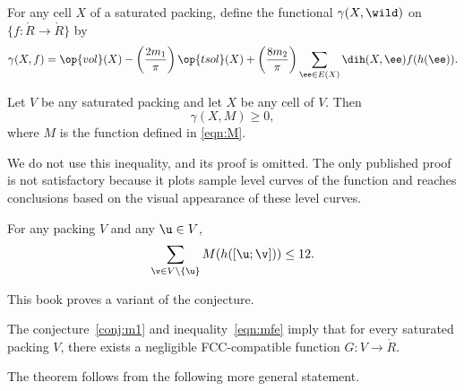 \begin{definition}[$\gamma$] 
   For any cell $X$ of a saturated
  packing, define the functional $\gamma(X,\wild)$ on
  $\{f:\ring{R}\to\ring{R}\}$ by
\begin{equation}\label{eqn:gamma-def} 
\gamma(X,f) =  \op{vol}(X)
-\left(\frac{2m_1}{\pi}\right) \op{tsol}(X) + \left(\frac{8m_2}{\pi}\right)
\sum_{\ee\in E(X)} \dih(X,\ee)  f(h(\ee)).
\end{equation}
%
\end{definition}


\begin{theorem*}[]\label{lemma:MI} 
  Let $V$ be any saturated packing and let $X$ be any cell of
  $V$.  Then
\begin{equation}\label{eqn:mfe} 
\gamma(X,M)\ge 0,
\end{equation}
where $M$ is the function defined in \eqref{eqn:M}.
\end{theorem*}

\begin{remark}  %
  We do not use this inequality, and its proof is omitted.  
  The only published proof~\cite{marchal:2009} is not satisfactory because
  it plots sample level curves of the function and reaches conclusions
  based on the visual appearance of these level curves.
\end{remark}


\begin{conjecture}[Marchal]\label{conj:m1} 
For any packing $ V$ and
any $ \u\in V$,
\[  
\sum_{\v\in V\setminus\{\u\}} M(h([\u;\v])) \le 12.
\] 
\end{conjecture}

This book proves a variant of the 
conjecture.

\begin{theorem}\label{theorem:mk1} 
  The conjecture~\eqref{conj:m1} and 
  inequality~\eqref{eqn:mfe} imply that for every saturated packing
  $V$, there exists a negligible FCC-compatible function $G:V\to
  \ring{R}$.
\end{theorem}

The theorem follows from the following more general statement.

